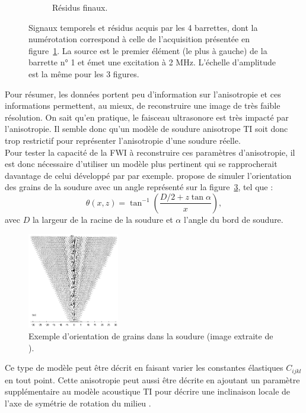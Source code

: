 \begin{figure}[h!]
\begin{changemargin}{-1cm}{-2cm}
\begin{subfigure}[b]{0.29\textwidth}
		\caption{Résidus finaux.\label{app:ani:data_ap}}
	\end{subfigure}
	\caption{ Signaux temporels et résidus acquis par les 4 barrettes, dont la numérotation correspond à celle de l'acquisition présentée en figure~\ref{app:ani:data_ap}. La source est le premier élément (le plus à gauche) de la barrette n° 1 et émet une excitation à 2 MHz.   L'échelle d'amplitude est la même pour les 3 figures. \label{app:ani:data}}
	\end{changemargin}
\end{figure}

 Pour résumer, les données portent peu d'information sur l'anisotropie et ces informations permettent, au mieux, de reconstruire une image de très faible résolution. On sait qu'en pratique, le faisceau ultrasonore est très impacté par l'anisotropie. Il semble donc qu'un modèle de soudure anisotrope TI soit donc trop restrictif pour représenter l'anisotropie d'une soudure réelle.\\
 
 Pour tester la capacité de la FWI à reconstruire ces paramètres d'anisotropie, il est donc nécessaire d'utiliser un modèle plus pertinent qui se rapprocherait davantage de celui développé par \cite{ogilvy} par exemple.	\cite{ogilvy} propose de simuler l'orientation des grains de la soudure avec un angle représenté sur la figure~\ref{ogilvy_soud}, tel que : 
	\begin{equation}
		\theta(x,z) = \tan^{-1}\left( \frac{D/2 + z\tan\alpha}{x} \right),
	\end{equation}
	avec $D$ la largeur de la racine de la soudure et $\alpha$  l'angle du bord de soudure. 
 
\begin{figure}[!h]
	\centering
			\includegraphics[width=4cm]{img/ogilvy_modele.png}
			\caption{ Exemple d'orientation de grains dans la soudure (image extraite de \cite{ogilvy}).\label{ogilvy_soud}}
\end{figure} 

Ce type de modèle peut être décrit en faisant varier les constantes élastiques $C_{ijkl}$ en tout point. Cette anisotropie peut aussi être décrite en ajoutant un paramètre supplémentaire au modèle acoustique TI pour décrire une inclinaison locale de l'axe de symétrie de rotation du milieu \citep{alkhalifah_TTI}.


